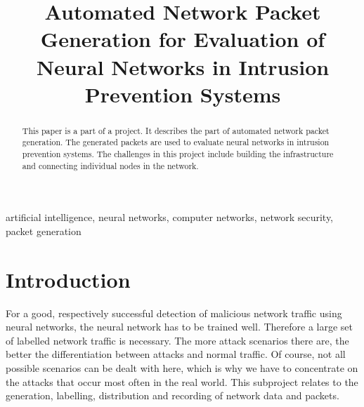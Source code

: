 \documentclass[conference]{IEEEtran}
\begin{document}
\title{Automated Network Packet Generation for Evaluation of Neural Networks in Intrusion Prevention Systems}

\author{
\and
{}
\and
{}
}

\maketitle

\begin{abstract}
This paper is a part of a project. It describes the part of automated network packet generation. The generated packets are used to evaluate neural networks in intrusion prevention systems. The challenges in this project include 
building the infrastructure and connecting individual nodes in the network.
\end{abstract}

\begin{IEEEkeywords}
artificial intelligence, neural networks, computer networks, network security, packet generation
\end{IEEEkeywords}

\section{Introduction}
For a good, respectively successful detection of malicious network traffic using neural networks, the neural network has to be trained well. Therefore a large set of labelled network traffic is necessary. The more attack scenarios there are, the better the differentiation between attacks and normal traffic. Of course, not all possible scenarios can be dealt with here, which is why we have to concentrate on the attacks that occur most often in the real world. This subproject relates to the generation, labelling, distribution and recording of network data and packets. 
\end{document}
